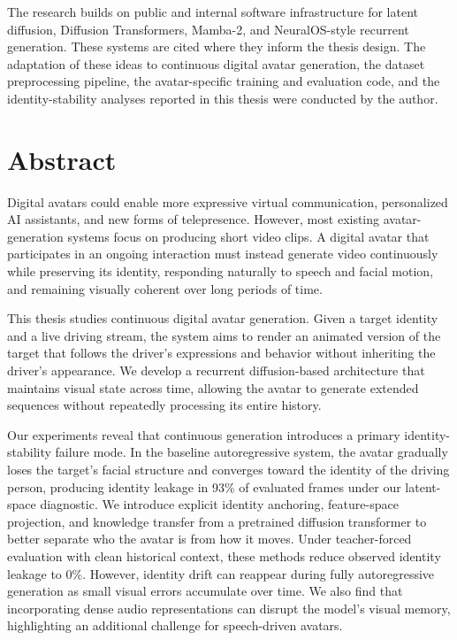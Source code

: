 \documentclass[12pt,letterpaper]{report}
\begin{document}
The research builds on public and internal software infrastructure for latent diffusion, Diffusion Transformers, Mamba-2, and NeuralOS-style recurrent generation. These systems are cited where they inform the thesis design. The adaptation of these ideas to continuous digital avatar generation, the dataset preprocessing pipeline, the avatar-specific training and evaluation code, and the identity-stability analyses reported in this thesis were conducted by the author.

\chapter*{Abstract}
Digital avatars could enable more expressive virtual communication, personalized AI assistants, and new forms of telepresence. However, most existing avatar-generation systems focus on producing short video clips. A digital avatar that participates in an ongoing interaction must instead generate video continuously while preserving its identity, responding naturally to speech and facial motion, and remaining visually coherent over long periods of time.

This thesis studies continuous digital avatar generation. Given a target identity and a live driving stream, the system aims to render an animated version of the target that follows the driver's expressions and behavior without inheriting the driver's appearance. We develop a recurrent diffusion-based architecture that maintains visual state across time, allowing the avatar to generate extended sequences without repeatedly processing its entire history.

Our experiments reveal that continuous generation introduces a primary identity-stability failure mode. In the baseline autoregressive system, the avatar gradually loses the target's facial structure and converges toward the identity of the driving person, producing identity leakage in 93\% of evaluated frames under our latent-space diagnostic. We introduce explicit identity anchoring, feature-space projection, and knowledge transfer from a pretrained diffusion transformer to better separate who the avatar is from how it moves. Under teacher-forced evaluation with clean historical context, these methods reduce observed identity leakage to 0\%. However, identity drift can reappear during fully autoregressive generation as small visual errors accumulate over time. We also find that incorporating dense audio representations can disrupt the model's visual memory, highlighting an additional challenge for speech-driven avatars.
\end{document}
